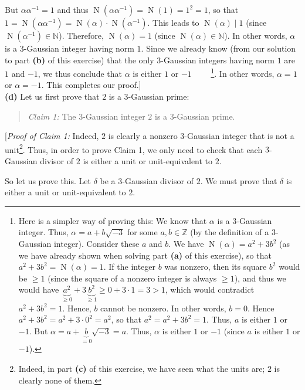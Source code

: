 \documentclass[paper=a4, fontsize=12pt]{scrartcl}%
\newcommand{\NN}{\mathbb{N}}
\newcommand{\ZZ}{\mathbb{Z}}
\newcommand{\tup}[1]{\left( #1 \right)}
\newcommand{\st}{\sqrt{-3}}
\newcommand{\No}{\operatorname{N}}
\theoremstyle{plainsl}
\theoremstyle{definition}
\theoremstyle{remark}
\newenvironment{statement}{\begin{quote}}{\end{quote}}
\begin{document}
But $\alpha \alpha^{-1} = 1$ and thus
$\No\tup{\alpha \alpha^{-1}} = \No\tup{1} = 1^2 = 1$,
so that
$1 = \No\tup{\alpha \alpha^{-1}}
= \No\tup{\alpha} \cdot \No\tup{\alpha^{-1}}$.
This leads to $\No\tup{\alpha} \mid 1$ (since $\No\tup{\alpha^{-1}} \in \NN$).
Therefore, $\No\tup{\alpha} = 1$
(since $\No\tup{\alpha} \in \NN$).
In other words, $\alpha$ is a $3$-Gaussian integer having norm
$1$.
Since we already know (from our solution to part \textbf{(b)}
of this exercise) that the
only $3$-Gaussian integers having norm $1$ are $1$ and $-1$,
we thus conclude that $\alpha$ is either $1$ or $-1$
\ \ \ \ \footnote{Here is a simpler way of proving this:
We know that $\alpha$ is a $3$-Gaussian integer.
Thus, $\alpha = a + b\st$ for some $a, b \in \ZZ$ (by the definition
of a $3$-Gaussian integer). Consider these $a$ and $b$.
We have $\No \tup{\alpha} = a^2 + 3 b^2$
(as we have already shown when solving part \textbf{(a)} of
this exercise), so that $a^2 + 3 b^2 = \No\tup{\alpha} = 1$.
If the integer $b$ was nonzero, then its square $b^2$ would be
$\geq 1$ (since the square of a nonzero integer is always $\geq 1$),
and thus we would have
$\underbrace{a^2}_{\geq 0} + 3 \underbrace{b^2}_{\geq 1}
\geq 0 + 3 \cdot 1 = 3 > 1$,
which would contradict $a^2 + 3 b^2 = 1$.
Hence, $b$ cannot be nonzero.
In other words, $b = 0$. Hence $a^2 + 3 b^2 = a^2 + 3 \cdot 0^2
= a^2$, so that $a^2 = a^2 + 3 b^2 = 1$. Thus, $a$ is either $1$
or $-1$.
But $\alpha = a + \underbrace{b}_{= 0} \st = a$.
Thus, $\alpha$ is either $1$ or $-1$ (since $a$ is either $1$
or $-1$).}.
In other words, $\alpha = 1$ or $\alpha = -1$.
This completes our proof.]
\\[0.4cm]

\textbf{(d)} Let us first prove that $2$ is a $3$-Gaussian prime:

\begin{statement}
 \textit{Claim 1:} The $3$-Gaussian integer $2$ is a $3$-Gaussian prime.
\end{statement}

[\textit{Proof of Claim 1:}
Indeed, $2$ is clearly a nonzero $3$-Gaussian integer that is
not a unit\footnote{Indeed, in part \textbf{(c)} of this
exercise, we have seen what the units are; $2$ is clearly
none of them.}.
Thus, in order to prove Claim 1,
we only need to check that each $3$-Gaussian divisor of $2$ is either a
unit or unit-equivalent to $2$.

So let us prove this. Let $\delta$ be a $3$-Gaussian divisor of
$2$. We must prove that $\delta$ is either a unit or unit-equivalent to $2$.
\end{document}
